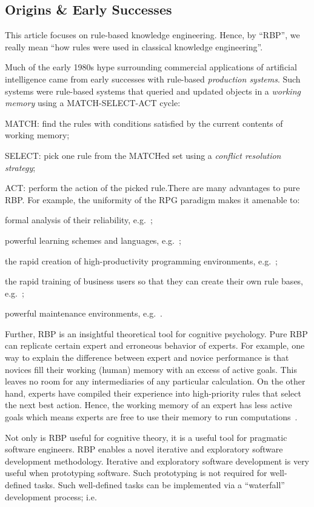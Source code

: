 \documentclass[twocolumn,global]{sys/svjour}
\begin{document}
\subsection{Origins \& Early Successes}

This article focuses on rule-based knowledge engineering. Hence, by
``RBP'', we really mean ``how rules were used in classical knowledge
engineering''.

Much of the early 1980s hype surrounding commercial applications of
artificial intelligence came from early successes  with
 rule-based {\em production
systems}. Such systems were rule-based systems that queried and
updated objects in a {\em working memory} using a MATCH-SELECT-ACT
cycle: \bi \item MATCH: find the rules with conditions satisfied by
the current contents of working memory; \item SELECT: pick one rule
from the MATCHed set using a {\em conflict resolution strategy};
\item ACT: perform the action of the picked rule.\ei There are many
advantages to pure RBP. For example,  the uniformity of the RPG
paradigm makes it amenable to: \bi \item formal analysis of their
reliability, e.g.~\cite{chen95}; \item powerful learning schemes and
languages, e.g.~\cite{laird86}; \item the rapid creation of
high-productivity programming environments,
e.g.~\cite{lukose99,vandebrug86,marcus89}; \item the rapid training
of business users so that they  can create their own rule bases,
e.g.~\cite{mebfd92,men87a}; \item powerful
 maintenance environments, e.g.~\cite{preston93,compton92}. \ei

Further, RBP is  an insightful theoretical tool for cognitive
psychology.  Pure RBP can replicate certain expert and erroneous
behavior of experts. For example, one way to explain the difference
between expert and novice performance is that novices fill their
working (human) memory with an excess of active goals. This leaves no
room for any intermediaries of any particular calculation. On the
other hand, experts have  compiled their experience into
high-priority rules that select the next best action.  Hence, the
working memory of an expert has less active goals which means
experts are free to use their memory to run
computations~\cite{simon80}.

Not only is RBP useful for cognitive theory, it is a useful tool for
pragmatic software engineers.
 RBP enables a novel  iterative  and exploratory software  development methodology.
Iterative and exploratory software development is very useful when
prototyping software. Such prototyping is not required for
well-defined tasks. Such well-defined tasks can be implemented via a
  ``waterfall'' development process; i.e.
\end{document}
